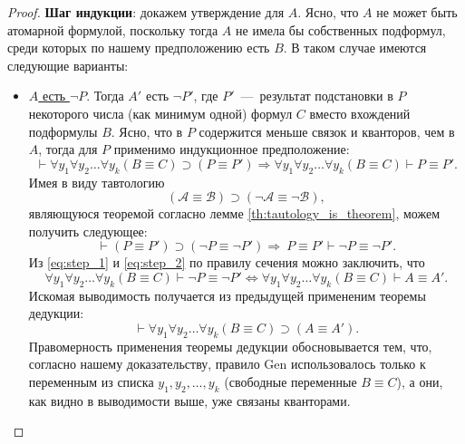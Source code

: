 \begin{proof}
    \textbf{Шаг индукции}: докажем утверждение для $A$. Ясно, что $A$ не может быть атомарной формулой, поскольку тогда $A$ не имела бы собственных подформул, среди которых по нашему предположению есть $B$. В таком случае имеются следующие варианты:
    \begin{itemize}
        \item \underline{$A$ есть $\neg P$}. Тогда $A'$ есть $\neg P'$, где $P'$~---~результат подстановки в $P$ некоторого числа (как минимум одной) формул $C$ вместо вхождений подформулы $B$. Ясно, что в $P$ содержится меньше связок и кванторов, чем в $A$, тогда для $P$ применимо индукционное предположение:
        \begin{equation}\label{eq:step_1}
            \vdash \forall y_1\forall y_2\dots\forall y_k(B \equiv C) \supset (P \equiv P') \Longrightarrow \forall y_1\forall y_2\dots\forall y_k(B \equiv C) \vdash P \equiv P'.
        \end{equation}
        Имея в виду тавтологию
        \[
            (\mathcal{A} \equiv \mathcal{B}) \supset (\neg \mathcal{A} \equiv \neg \mathcal{B}),
        \]
        являющуюся теоремой согласно лемме \ref{th:tautology_is_theorem}, можем получить следующее:
        \begin{equation}\label{eq:step_2}
            \vdash (P \equiv P') \supset (\neg P \equiv \neg P') \Longrightarrow\ P \equiv P' \vdash \neg P \equiv \neg P'.
        \end{equation}
        Из \eqref{eq:step_1} и \eqref{eq:step_2} по правилу сечения можно заключить, что
        \[
            \forall y_1\forall y_2\dots\forall y_k(B \equiv C) \vdash \neg P \equiv \neg P' \Longleftrightarrow \forall y_1\forall y_2\dots\forall y_k(B \equiv C) \vdash A \equiv A'.
        \]
        Искомая выводимость получается из предыдущей примененим теоремы дедукции:
        \[
            \vdash \forall y_1\forall y_2\dots\forall y_k(B \equiv C) \supset (A \equiv A').
        \]
        Правомерность применения теоремы дедукции обосновывается тем, что, согласно нашему доказательству, правило Gen использовалось только к переменным из списка $y_1, y_2, \dots, y_k$ (свободные переменные $B \equiv C$), а они, как видно в выводимости выше, уже связаны кванторами.


\end{itemize}
\end{proof}

